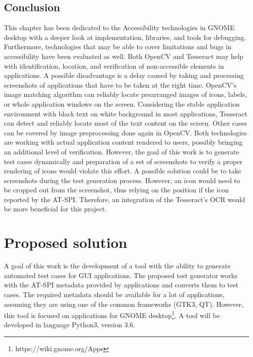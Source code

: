 \section{Conclusion}\label{ocr_conclusion}
This chapter has been dedicated to the Accessibility technologies in GNOME desktop with a deeper look at implementation, libraries, and tools for debugging. Furthermore, technologies that may be able to cover limitations and bugs in accessibility have been evaluated as well. Both OpenCV and Tesseract may help with identification, location, and verification of non-accessible elements in applications. A possible disadvantage is a delay caused by taking and processing screenshots of applications that have to be taken at the right time. OpenCV's image matching algorithm can reliably locate prearranged images of icons, labels, or whole application windows on the screen. Considering the stable application environment with black text on white background in most applications, Tesseract can detect and reliably locate most of the text content on the screen. Other cases can be covered by image preprocessing done again in OpenCV. Both technologies are working with actual application content rendered to users, possibly bringing an additional level of verification. However, the goal of this work is to generate test cases dynamically and preparation of a set of screenshots to verify a proper rendering of icons would violate this effort. A possible solution could be to take screenshots during the test generation process. However, an icon would need to be cropped out from the screenshot, thus relying on the position if the icon reported by the AT-SPI. Therefore, an integration of the Tesseract's OCR would be more beneficial for this project.

\chapter{Proposed solution}\label{proposed_solution}
A goal of this work is the development of a tool with the ability to generate automated test cases for GUI applications. The proposed test generator works with the AT-SPI metadata provided by applications and converts them to test cases. The required metadata should be available for a lot of applications, assuming they are using one of the common frameworks (GTK3, QT). However, this tool is focused on applications for GNOME desktop\footnote{https://wiki.gnome.org/Apps}. A tool will be developed in language Python3, version 3.6.

